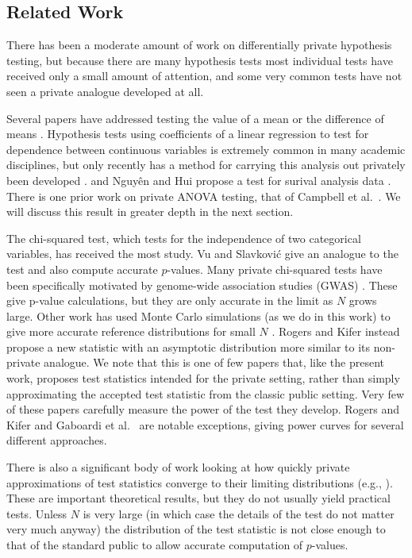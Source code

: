 \subsection{Related Work}


There has been a moderate amount of work on differentially private hypothesis testing, but because there are many hypothesis tests most individual tests have received only a small amount of attention, and some very common tests have not seen a private analogue developed at all.  


Several papers have addressed testing the value of a mean or the difference of means \cite{solea2014differentially, d2015differential, ding2018comparing}.  Hypothesis tests using coefficients of a linear regression to test for dependence between continuous variables is extremely common in many academic disciplines, but only recently has a method for carrying this analysis out privately been developed \cite{sheffet2015differentially, barrientos2017differentially}. and Nguy{\^e}n and Hui propose a test for surival analysis data \cite{nguyen2017differentially}.  There is one prior work on private ANOVA testing, that of  Campbell et al.~\cite{campbell2018diffprivanova}.  We will discuss this result in greater depth in the next section.


The chi-squared test, which tests for the independence of two categorical variables, has received the most study.  Vu and Slavkovi\'{c} \cite{vu2009differential} give an analogue to the test and also compute accurate $p$-values.   Many private chi-squared tests have been specifically motivated by genome-wide association studies (GWAS)  \cite{fienberg2011privacy, uhlerop2013privacy, johnson2013privacy}.  These give p-value calculations, but they are only accurate in the limit as $N$ grows large.  Other work has used Monte Carlo simulations (as we do in this work) to give more accurate reference distributions for small $N$ \cite{gaboardi2016differentially, wang2015revisiting}.  Rogers and Kifer \cite{rogers2017new} instead propose a new statistic with an asymptotic distribution more similar to its non-private analogue.  We note that this is one of few papers that, like the present work, proposes test statistics intended for the private setting, rather than simply approximating the accepted test statistic from the classic public setting. Very few of these papers carefully measure the power of the test they develop.  Rogers and Kifer \cite{rogers2017new} and Gaboardi et al.~\cite{gaboardi2016differentially} are notable exceptions, giving power curves for several different approaches.


There is also a significant body of work looking at how quickly private approximations of test statistics converge to their limiting distributions (e.g., \cite{smith2008efficient, wasserman2010statistical, smith2011privacy}).  These are important theoretical results, but they do not usually yield practical tests.  Unless $N$ is very large (in which case the details of the test do not matter very much anyway) the distribution of the test statistic is not close enough to that of the standard public to allow accurate computation of $p$-values.